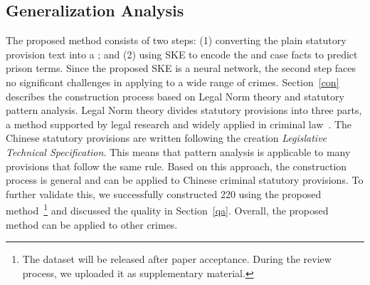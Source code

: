 
\vspace{-0.5em}
\subsection{Generalization Analysis}
The proposed method consists of two steps: (1) converting the plain statutory provision text into a \lawgraph{}; and (2) using SKE to encode the \lawgraph{} and case facts to predict prison terms. Since the proposed SKE is a neural network, the second step faces no significant challenges in applying to a wide range of crimes. Section~\ref{con} describes the construction process based on Legal Norm theory and statutory pattern analysis. Legal Norm theory divides statutory provisions into three parts, a method supported by legal research and widely applied in criminal law~\cite{Greco2023BringingOI,wang-etal-2022-d2gclf}. The Chinese statutory provisions are written following the creation \textit{Legislative Technical Specification}. This means that pattern analysis is applicable to many provisions that follow the same rule. Based on this approach, the \lawgraph{} construction process is general and can be applied to Chinese criminal statutory provisions. To further validate this, we successfully constructed 220  using the proposed method~\footnote{The  dataset will be released after paper acceptance. During the review process, we uploaded it as supplementary material.} and discussed the quality in Section~\ref{qa}. Overall, the proposed method can be applied to other crimes.


\vspace{-1em}

